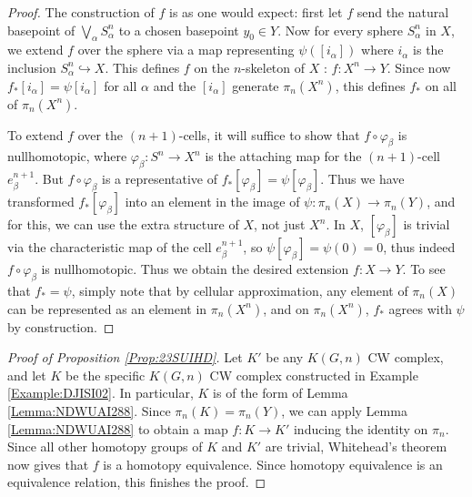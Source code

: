 \documentclass[reqno]{amsart}
\theoremstyle{definition}
\theoremstyle{remark}
\begin{document}
\begin{proof}
    The construction of $f$ is as one would expect:
    first let $f$ send the natural basepoint of
    $\bigvee_{\alpha} S_{\alpha}^{n}$ to a chosen
    basepoint $y_0 \in Y$.
    Now for every sphere $S_{\alpha}^{n}$ in $X$,
    we extend $f$ over the sphere via a map
    representing $\psi \left( \left[ i_{\alpha} \right]  \right) 
    $ where $i_{\alpha}$ is the inclusion
    $S_{\alpha}^{n} \hookrightarrow X$. This defines
    $f$ on the $n$-skeleton of $X$ : $f \colon X^{n} \to Y$.
    Since now $f_* \left[ i_{\alpha} \right] =
    \psi \left[ i_{\alpha} \right] $ for all $\alpha$ and
    the $\left[ i_{\alpha} \right] $ generate
    $\pi_n \left( X^{n} \right) $, this
    defines $f_*$ on all of $\pi_n(X^{n})$.

    To extend $f$ over the $(n+1)$-cells, it will suffice
    to show that $f \circ \varphi_{\beta}$ is nullhomotopic,
    where $\varphi_{\beta} \colon S^{n} \to X^{n}$ is the
    attaching map for the $(n+1)$-cell $e_{\beta}^{n+1}$.
    But $f \circ \varphi_{\beta}$ is a representative
    of $f_* \left[ \varphi_{\beta} \right] =
    \psi \left[ \varphi_{\beta} \right] $.
    Thus we have transformed $f_* \left[ \varphi_{\beta} \right] $ 
    into an element in the image of
    $\psi \colon \pi_n(X) \to \pi_n(Y)$, and
    for this, we can use the extra structure of $X$, not just
    $X^{n}$. In $X$, $\left[ \varphi_{\beta} \right] $ is
    trivial via the
    characteristic map of the cell
    $e_{\beta}^{n+1}$, so $\psi \left[ \varphi_{\beta} \right] =
    \psi (0) = 0$, thus indeed
    $f \circ \varphi_{\beta}$ is nullhomotopic.
    Thus we obtain the desired extension
    $f \colon X \to Y$.
    To see that $f_* = \psi $, simply note that
    by cellular approximation, any element
    of $\pi_n(X)$ can be represented as
    an element in $\pi_n(X^{n})$, and on
    $\pi_n(X^{n})$, $f_*$ agrees with $\psi $ by construction.
\end{proof}


\begin{proof}[Proof of Proposition \ref{Prop:23SUIHD}]
    Let $K'$ be any $K\left( G,n \right) $ CW complex, and
    let $K$ be the specific $K(G,n)$ CW complex constructed
    in Example \ref{Example:DJISI02}. In particular,
    $K$ is of the form of 
    Lemma \ref{Lemma:NDWUAI288}. Since
    $\pi_n(K) = \pi_n(Y)$, we can apply Lemma
    \ref{Lemma:NDWUAI288} to obtain a map
    $f \colon K \to K'$ inducing the identity
    on $\pi_n$. Since all other homotopy groups
    of $K$ and $K'$ are trivial, Whitehead's theorem now gives
    that $f$ is a homotopy equivalence. Since
    homotopy equivalence is an equivalence relation, this finishes
    the proof.
\end{proof}
\end{document}
